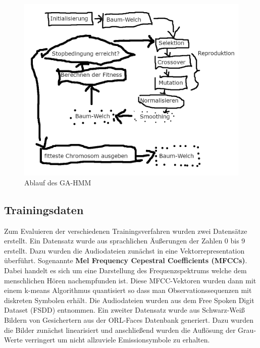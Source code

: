 \begin{figure}[h!]
    \includegraphics[scale=1.0]{images/GA-HMM_Flowchart.png}
    \caption{Ablauf des GA-HMM}
    \label{fig:gahmm_flowchart}
\end{figure}

\subsection*{Trainingsdaten}
Zum Evaluieren der verschiedenen Trainingsverfahren wurden zwei Datensätze erstellt. Ein Datensatz wurde aus sprachlichen Äußerungen der Zahlen 0 bis 9 erstellt. Dazu wurden die Audiodateien zunächst in eine Vektorrepresentation überführt. Sogenannte \textbf{Mel Frequency Cepestral Coefficients (MFCCs)}. Dabei handelt es sich um eine Darstellung des Frequenzspektrums welche dem menschlichen Hören nachempfunden ist. Diese MFCC-Vektoren wurden dann mit einem k-means Algorithmus quantisiert so dass man Observationssequenzen mit diskreten Symbolen erhält. Die Audiodateien wurden aus dem Free Spoken Digit Dataset (FSDD) entnommen. Ein zweiter Datensatz wurde aus Schwarz-Weiß Bildern von Gesichertern aus der ORL-Faces Datenbank generiert. Dazu wurden die Bilder zunächst linearisiert und anschließend wurden die Auflösung der Grau-Werte verringert um nicht allzuviele Emissionsymbole zu erhalten.

